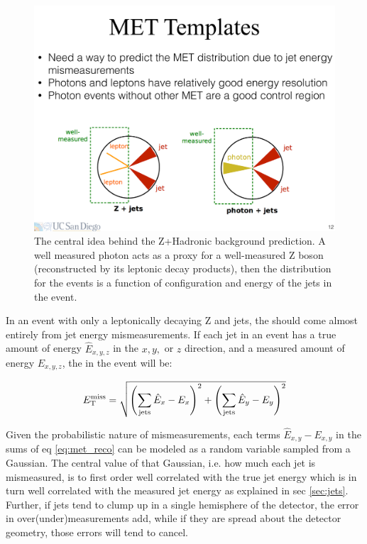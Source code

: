     \begin{figure}[h!]
      \centering
      \includegraphics[width=\textwidth]{figures/MET_templates_idea.pdf}
      \caption{The central idea behind the Z+Hadronic background prediction. A well measured photon acts as a proxy for a well-measured Z boson (reconstructed by its leptonic decay products), then the \MET distribution for the events is a function of configuration and energy of the jets in the event.}
      \label{fig:met_templates_idea}
    \end{figure}

    In an event with only a leptonically decaying Z and jets, the \MET should come almost entirely from jet energy mismeasurements. If each jet in an event has a true amount of energy $\hat{E}_{x,y,z}$ in the $x,y,$ or $z$ direction, and a measured amount of energy $E_{x,y,z}$, the \MET in the event will be: 

    \begin{align}
      E_{\mathrm{T}}^{\text{miss}} = \sqrt{\left(\sum_{\text{jets}} \hat{E}_{x} - E_{x} \right)^2 + \left(\sum_{\text{jets}} \hat{E}_{y} - E_{y} \right)^2} \label{eq:met_reco}
    \end{align}

    Given the probabilistic nature of mismeasurements, each terms $\hat{E}_{x,y} - E_{x,y}$ in the sums of eq \ref{eq:met_reco} can be modeled as a random variable sampled from a Gaussian. The central value of that Gaussian, i.e. how much each jet is mismeasured, is to first order well correlated with the true jet energy which is in turn well correlated with the measured jet energy as explained in sec \ref{sec:jets}. Further, if jets tend to clump up in a single hemisphere of the detector, the error in over(under)measurements add, while if they are spread about the detector geometry, those errors will tend to cancel.

